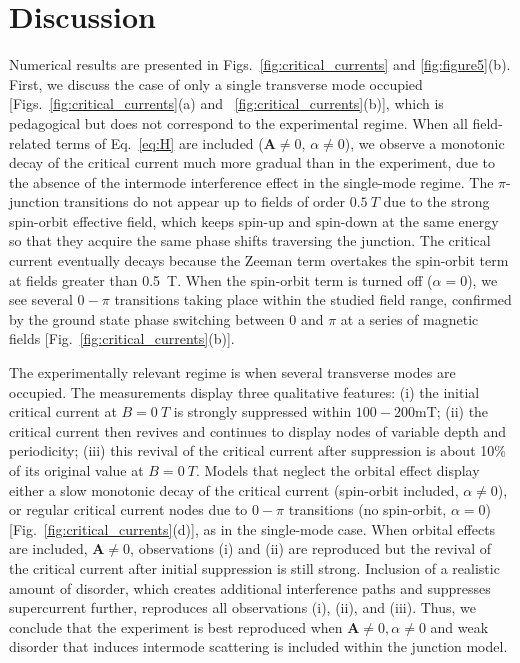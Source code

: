 \section{Discussion}
Numerical results are presented in Figs.~\ref{fig:critical_currents} and \ref{fig:figure5}(b).
First, we discuss the case of only a single transverse mode occupied [Figs.~\ref{fig:critical_currents}(a) and ~\ref{fig:critical_currents}(b)], which is pedagogical but does not correspond to the experimental regime.
When all field-related terms of Eq.~\eqref{eq:H} are included ($\mathbf{A}\neq 0$, $\alpha \neq 0$), we observe a monotonic decay of the critical current much more gradual than in the experiment, due to the absence of the intermode interference effect in the single-mode regime.
The $\pi$-junction transitions do not appear up to fields of order $\SI{0.5}{T}$ due to the strong spin-orbit effective field, which keeps spin-up and spin-down at the same energy so that they acquire the same phase shifts traversing the junction.
The critical current eventually decays because the Zeeman term overtakes the spin-orbit term at fields greater than \SI{0.5}{\tesla}.
When the spin-orbit term is turned off ($\alpha = 0$), we see several $0-\pi$ transitions taking place within the studied field range, confirmed by the ground state phase switching between 0 and $\pi$ at a series of magnetic fields [Fig.~\ref{fig:critical_currents}(b)].

The experimentally relevant regime is when several transverse modes are occupied.
The measurements display three qualitative features: (i) the initial critical current at $B=\SI{0}{T}$ is strongly suppressed within $100-200$mT; (ii) the critical current then revives and continues to display nodes of variable depth and periodicity; (iii) this revival of the critical current after suppression is about 10\% of its original value at $B=\SI{0}{T}$.
Models that neglect the orbital effect display either a slow monotonic decay of the critical current (spin-orbit included, $\alpha \neq 0$), or regular critical current nodes due to $0-\pi$ transitions (no spin-orbit, $\alpha=0$) [Fig.~\ref{fig:critical_currents}(d)], as in the single-mode case.
When orbital effects are included, $\mathbf{A}\neq 0$, observations (i) and (ii) are reproduced but the revival of the critical current after initial suppression is still strong.
Inclusion of a realistic amount of disorder, which creates additional interference paths and suppresses supercurrent further, reproduces all observations (i), (ii), and (iii).
Thus, we conclude that the experiment is best reproduced when $\mathbf{A}\neq 0, \alpha \neq 0$ and weak disorder that induces intermode scattering is included within the junction model.

